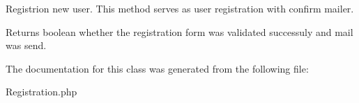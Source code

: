 Registrion new user. This method serves as user registration with confirm mailer.

\begin{DoxyReturn}{Returns}
boolean whether the registration form was validated successuly and mail was send. 
\end{DoxyReturn}


The documentation for this class was generated from the following file\+:\begin{DoxyCompactItemize}
\item 
Registration.\+php\end{DoxyCompactItemize}
